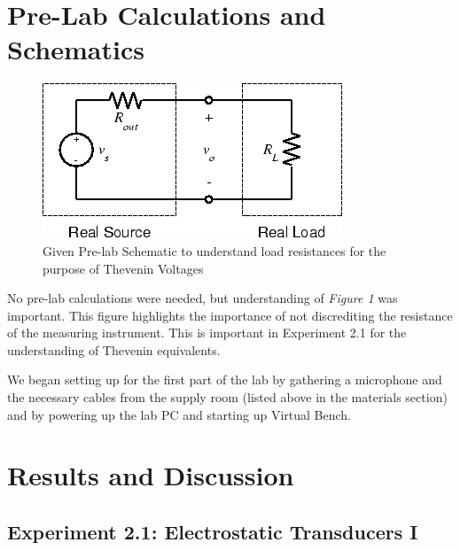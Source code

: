 \documentclass[10pt]{article}
\begin{document}
\section{Pre-Lab Calculations and Schematics}

\begin{center}
	\begin{figure} [H]
		\centering
		\includegraphics[scale=0.5]{images/prelab.png}
		\caption{Given Pre-lab Schematic to understand load resistances for the purpose of Thevenin Voltages}
	\end{figure}
\end{center}
No pre-lab calculations were needed, but understanding of \textit{Figure 1} was important. This figure highlights the importance of not discrediting the resistance of the  measuring instrument. This is important in Experiment 2.1 for the understanding of Thevenin equivalents.

We began setting up for the first part of the lab by gathering a microphone and the necessary cables from the supply room (listed above in the materials section) and by powering up the lab PC and starting up Virtual Bench. 

\medskip


\section{Results and Discussion}

\subsection{Experiment 2.1: Electrostatic Transducers I}
\end{document}
